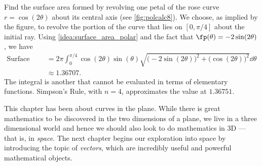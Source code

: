 \begin{example}\label{ex_polcalc8}
Find the surface area formed by revolving one petal of the rose curve $r=\cos(2\theta)$ about its central axis (see \autoref{fig:polcalc8}).
\solution
{}
We choose, as implied by the figure, to revolve the portion of the curve that lies on $[0,\pi/4]$ about the initial ray. Using \autoref{idea:surface_area_polar} and the fact that $\fp(\theta) = -2\sin(2\theta)$, we have
\begin{align*}
\text{Surface Area}
&= 2\pi\int_0^{\pi/4} \cos(2\theta)\sin(\theta)
\sqrt{\bigl(-2\sin(2\theta)\bigr)^2+\bigl(\cos(2\theta)\bigr)^2}\dd\theta \\
&\approx 1.36707.
\end{align*}
The integral is another that cannot be evaluated in terms of elementary functions. Simpson's Rule, with $n=4$, approximates the value at $1.36751$.%
\end{example}


This chapter has been about curves in the plane. While there is great mathematics to be discovered in the two dimensions of a plane, we live in a three dimensional world and hence we should also look to do mathematics in 3D --- that is, in \emph{space}. The next chapter begins our exploration into space by introducing the topic of \emph{vectors}, which are incredibly useful and powerful mathematical objects.


